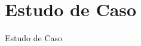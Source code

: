 \section{Estudo de Caso}
\begin{frame}{Estudo de Caso}

	\begin{columns}
	    
  
    	
    
    \end{columns}
\end{frame}
